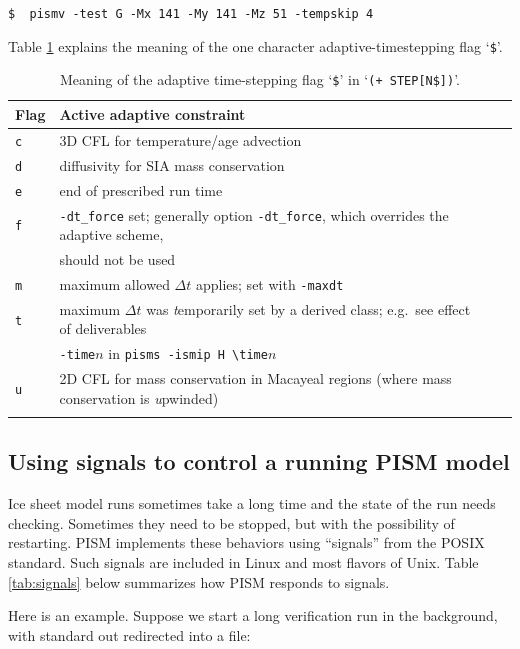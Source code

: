 \documentclass[11pt,final]{amsart}
\begin{document}
\verb|$  pismv -test G -Mx 141 -My 141 -Mz 51 -tempskip 4|

Table \ref{tab:adaptiveflag} explains the meaning of the one character adaptive-timestepping flag `\verb|$|'.

\begin{table}[h]
\caption{Meaning of the adaptive time-stepping flag `\texttt{\$}' in `\texttt{(+    STEP[N\$])}'.}\label{tab:adaptiveflag}
\begin{tabular}{@{}llll}\hline
\textbf{Flag} & \textbf{Active adaptive constraint} \\ \hline
\verb|c| & 3D CFL for temperature/age advection \cite{BBL} \\
\verb|d| & diffusivity for SIA mass conservation \cite{BBL} \\
\verb|e| & end of prescribed run time \\
\verb|f| & \verb|-dt_force| set; generally option \verb|-dt_force|, which overrides the adaptive scheme, \\
 & should not be used  \\
\verb|m| & maximum allowed $\Delta t$ applies; set with \verb|-maxdt| \\
\verb|t| & maximum $\Delta t$ was \emph{t}emporarily set by a derived class; e.g.~see effect of deliverables \\
 & \verb|-time|$n$ in \verb|pisms -ismip H \time|$n$ \\
\verb|u| & 2D CFL for mass conservation in Macayeal regions (where mass conservation is \emph{u}pwinded)\\
\hline
\normalsize
\end{tabular}
\end{table}

\subsection{Using signals to control a running PISM model} \label{subsect:signal}  Ice sheet model runs sometimes take a long time and the state of the run needs checking.  Sometimes they need to be stopped, but with the possibility of restarting.  PISM implements these behaviors using ``signals'' from the POSIX standard.  Such signals are included in Linux and most flavors of Unix.  Table \ref{tab:signals} below summarizes how PISM responds to signals.

Here is an example.  Suppose we start a long verification run in the background, with standard out redirected into a file:
\end{document}
